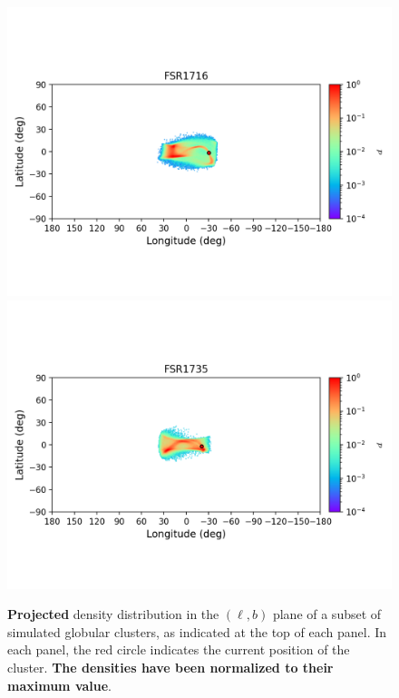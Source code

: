\begin{figure}
        \includegraphics[clip=true, trim = 0mm 20mm 0mm 10mm, width=1\columnwidth]{images/error_plots_FSR1716.png}
        \includegraphics[clip=true, trim = 0mm 20mm 0mm 10mm, width=1\columnwidth]{images/error_plots_FSR1735.png}
        \caption[]{\textbf{Projected} density distribution in the $(\ell, b)$ plane of a subset of simulated globular clusters, as indicated at the top of each panel. In each panel, the red circle indicates the current position of the cluster. \textbf{The densities have been normalized to their maximum value}.}\label{stream2}
        \end{figure}
